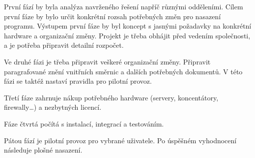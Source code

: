 První fází by byla analýza navrženého řešení napříč různými odděleními. Cílem první fáze by bylo určit konkrétní rozsah potřebných změn pro nasazení programu. Výstupem první fáze by byl koncept s jasnými požadavky na konkrétní hardware a organizační změny. Projekt je třeba obhájit před vedením společnosti, a je potřeba připravit detailní rozpočet.

Ve druhé fázi je třeba připravit veškeré organizační změny. Připravit paragrafované znění vnitřních směrnic a dalších potřebných dokumentů. V této fázi se taktéž nastaví pravidla pro pilotní provoz.

Třetí fáze zahrnuje nákup potřebného hardware (servery, koncentátory, firewally\ldots) a nezbytných licencí.

Fáze čtvrtá počítá s instalací, integrací a testováním. 

Pátou fází je pilotní provoz pro vybrané uživatele. Po úspěšném vyhodnocení následuje plošné nasazení.